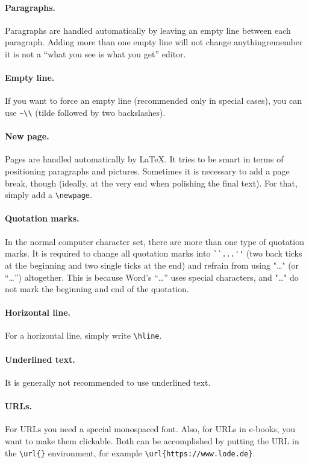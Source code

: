 \paragraph{Paragraphs.} Paragraphs are handled automatically by leaving an empty line between each paragraph. Adding more than one empty line will not change anything\textemdash{}remember it is not a ``what you see is what you get'' editor.

\paragraph{Empty line.} If you want to force an empty line (recommended only in special cases), you can use \lstinline[language=Tex]!~\\! (tilde followed by two backslashes).

\paragraph{New page.} Pages are handled automatically by \LaTeX{}. It tries to be smart in terms of positioning paragraphs and pictures. Sometimes it is necessary to add a page break, though (ideally, at the very end when polishing the final text). For that, simply add a \lstinline[language=Tex]!\newpage!.

\paragraph{Quotation marks.} In the normal computer character set, there are more than one type of quotation marks. It is required to change all quotation marks into \lstinline[language=Tex]!``...''! (two back ticks at the beginning and two single ticks at the end) and refrain from using "\dots" (or “\dots”) altogether. This is because Word's “\dots” uses special characters, and "\dots" do not mark the beginning and end of the quotation.

\paragraph{Horizontal line.} For a horizontal line, simply write \lstinline[language=Tex]!\hline!.

\paragraph{Underlined text.} It is generally not recommended to use underlined text.

\paragraph{URLs.} For URLs you need a special monospaced font. Also, for URLs in e-books, you want to make them clickable. Both can be accomplished by putting the URL in the \lstinline[language=Tex]!\url{}! environment, for example \lstinline[language=Tex]!\url{https://www.lode.de}!.

